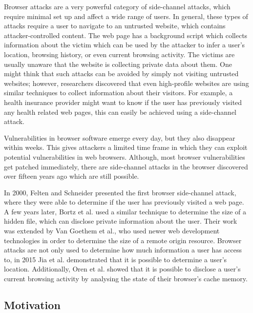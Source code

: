 \documentclass[a4paper,11pt]{article}
\begin{document}
Browser attacks are a very powerful category of side-channel attacks, which require minimal set up and affect a wide range of users. In general, these types of attacks require a user to navigate to an untrusted website, which contains attacker-controlled content. The web page has a background script which collects information about the victim which can be used by the attacker to infer a user's location, browsing history, or even current browsing activity. The victims are usually unaware that the website is collecting private data about them. One might think that such attacks can be avoided by simply not visiting untrusted websites; however, researchers discovered that even high-profile websites are using similar techniques to collect information about their visitors\cite{jang2010empirical}. For example, a health insurance provider might want to know if the user has previously visited any health related web pages, this can easily be achieved using a side-channel attack.

Vulnerabilities in browser software emerge every day, but they also disappear within weeks. This gives attackers a limited time frame in which they can exploit potential vulnerabilities in web browsers. Although, most browser vulnerabilities get patched immediately, there are side-channel attacks in the browser discovered over fifteen years ago which are still possible. 

In 2000, Felten and Schneider\cite{felten2000timing} presented the first browser side-channel attack, where they were able to determine if the user has previously visited a web page. A few years later, Bortz et al.\cite{bortz2007exposing} used a similar technique to determine the size of a hidden file, which can disclose private information about the user. Their work was extended by Van Goethem et al.\cite{van2015clock}, who used newer web development technologies in order to determine the size of a remote origin resource. Browser attacks are not only used to determine how much information a user has access to, in 2015 Jia et al.\cite{jia2015know} demonstrated that it is possible to determine a user's location. Additionally, Oren et al.\cite{oren2015spy} showed that it is possible to disclose a user's current browsing activity by analysing the state of their browser's cache memory.

\subsection*{Motivation}
\end{document}
